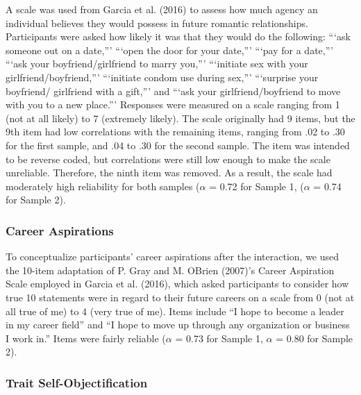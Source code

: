 \documentclass[man]{apa6}
\begin{document}
A scale was used from Garcia et al. (2016) to assess how much agency an
individual believes they would possess in future romantic relationships.
Participants were asked how likely it was that they would do the
following: \enquote{`ask someone out on a date,}' \enquote{`open the
door for your date,}' \enquote{`pay for a date,}' \enquote{`ask your
boyfriend/girlfriend to marry you,}' \enquote{`initiate sex with your
girlfriend/boyfriend,}' \enquote{`initiate condom use during sex,}'
\enquote{`surprise your boyfriend/ girlfriend with a gift,}' and
\enquote{`ask your girlfriend/boyfriend to move with you to a new
place.}' Responses were measured on a scale ranging from 1 (not at all
likely) to 7 (extremely likely). The scale originally had 9 items, but
the 9th item had low correlations with the remaining items, ranging from
.02 to .30 for the first sample, and .04 to .30 for the second sample.
The item was intended to be reverse coded, but correlations were still
low enough to make the scale unreliable. Therefore, the ninth item was
removed. As a result, the scale had moderately high reliability for both
samples (\(\alpha\) = 0.72 for Sample 1, (\(\alpha\) = 0.74 for Sample
2).

\subsubsection{Career Aspirations}\label{career-aspirations}

To conceptualize participants' career aspirations after the interaction,
we used the 10-item adaptation of P. Gray and M. OBrien (2007)'s Career
Aspiration Scale employed in Garcia et al. (2016), which asked
participants to consider how true 10 statements were in regard to their
future careers on a scale from 0 (not at all true of me) to 4 (very true
of me). Items include \enquote{I hope to become a leader in my career
field} and \enquote{I hope to move up through any organization or
business I work in.} Items were fairly reliable (\(\alpha\) = 0.73 for
Sample 1, \(\alpha\) = 0.80 for Sample 2).

\subsubsection{Trait
Self-Objectification}\label{trait-self-objectification}
\end{document}
